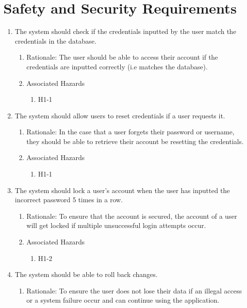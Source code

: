 \documentclass{article}
\begin{document}
\section{Safety and Security Requirements}
\begin{enumerate}
    \item The system should check if the credentials inputted by the user match the credentials in the database.
    \begin{enumerate}
        \item Rationale: The user should be able to access their account if the credentials are inputted correctly (i.e matches the database).
        \item Associated Hazards
        \begin{enumerate}
            \item H1-1
        \end{enumerate}
    \end{enumerate}
    \item The system should allow users to reset credentials if a user requests it.
    \begin{enumerate}
        \item Rationale: In the case that a user forgets their password or username, they should be able to retrieve their account be resetting the credentials.
        \item Associated Hazards
        \begin{enumerate}
            \item H1-1
        \end{enumerate}
    \end{enumerate}
     \item The system should lock a user’s account when the user has inputted the incorrect password 5 times in a row.
    \begin{enumerate}
        \item Rationale: To ensure that the account is secured, the account of a user will get locked if multiple unsuccessful login attempts occur. 
        \item Associated Hazards
        \begin{enumerate}
            \item H1-2
        \end{enumerate}
    \end{enumerate} 
     \item The system should be able to roll back changes. 
    \begin{enumerate}
        \item Rationale: To ensure the user does not lose their data if an illegal access or a system failure occur and can continue using the application.

\end{enumerate}
\end{enumerate}
\end{document}
